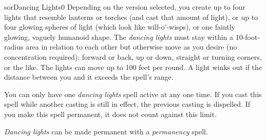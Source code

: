 \begin{spellcard}{sor}{Dancing Lights}{0}
  \spellcardqr{\urlgerman}
  Depending on the version selected, you create up to four lights that resemble lanterns or torches
  (and cast that amount of light), or up to four glowing spheres of light (which look like will-o'-wisps),
  or one faintly glowing, vaguely humanoid shape.
  The \emph{dancing lights} must stay within a 10-foot-radius area in relation to each other
  but otherwise move as you desire (no concentration required):
  forward or back, up or down, straight or turning corners, or the like.
  The lights can move up to 100 feet per round.
  A light winks out if the distance between you and it exceeds the spell's range.

  You can only have one \emph{dancing lights} spell active at any one time.
  If you cast this spell while another casting is still in effect, the previous casting is dispelled.
  If you make this spell permanent, it does not count against this limit.

  \emph{Dancing lights} can be made permanent with a \emph{permanency} spell.

\end{spellcard}
